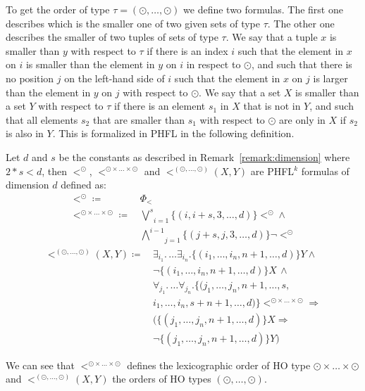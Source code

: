 To get the order of type $\tau = (\odot, \dots, \odot)$ we define two formulas. The first one describes which is the smaller one of two given sets of type $\tau$. The other one describes the smaller of two tuples of sets of type $\tau$. We say that a tuple $x$ is smaller than $y$ with respect to $
\tau$ if there is an index $i$ such that the element in $x$ on $i$ is smaller than the element in $y$ on $i$ in 
respect to $\odot$, and such that there is no position $j$ on the left-hand side of $i$ such 
that the element in $x$ on $j$ is larger than the element in $y$ on $j$ with respect to $\odot$. 
We say that a set $X$ is smaller than a set $Y$ with respect to $\tau$ if there is an element 
$s_1$ in $X$ that is not in $Y$, and such that all elements $s_2$ that are smaller than $s_1$ with respect to $\odot$ 
are only in $X$ if $s_2$ is also in $Y$. This is formalized in PHFL in the following definition.
\begin{definition}
    \label{definition:lower_bound_less_second}
    Let $d$ and $s$ be the constants as described in Remark~\ref{remark:dimension} where $2*s < d$, then $<^\odot$, $<^{\odot \times \dots
    \times \odot}$ and $<^{(\odot, \dots, \odot)}(X, Y)$ are PHFL$^k$ formulas of dimension $d$ defined as:
    \begin{align*}
        <^\odot \coloneqq &\,\Phi_< \\
        <^{\odot \times \dots \times \odot} \coloneqq
            &\,\underset{i = 1}{\overset{s}{\bigvee}}\{(i, i + s, 3, \dots, d)\} <^\odot \wedge \\
            &\,\underset{j = 1}{\overset{i - 1}{\bigwedge}}\{(j + s, j, 3, \dots, d)\} \neg <^\odot 
    \end{align*}
    \begin{align*}
        <^{(\odot, \dots, \odot)}(X, Y) \coloneqq
            &\,\exists_{i_1}.\, \dots \exists_{i_n}. \{(i_1, \dots, i_n, n + 1,\dots, d)\}Y \wedge \\
            &\,\neg \{(i_1, \dots, i_n, n + 1, \dots, d)\} X\,\wedge \\
            &\, \forall_{j_1}. \,\dots \forall_{j_n}. \{(j_1, \dots, j_n, n+1, \dots, s, \\
            &\,i_1, \dots, i_n, s + n + 1, \dots,  d)\}<^{\odot \times \dots \times \odot} \Rightarrow \\
            &\,(\{(j_1,\dots, j_n, n + 1, \dots, d)\} X \Rightarrow \\
            &\,\neg \{(j_1, \dots, j_n, n + 1, \dots, d)\} Y)
    \end{align*}
\end{definition}
We can see that  $<^{\odot \times \dots \times \odot}$ defines the lexicographic order of HO type $\odot \times \dots \times \odot$ and $<^{(\odot, \dots, \odot)}(X, Y)$ the orders of HO types $(\odot, \dots, \odot)$.

